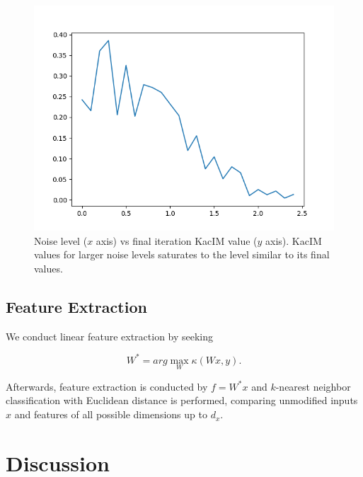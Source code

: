 \documentclass{article}
\begin{document}
\begin{figure}[t]
\label{fig:experiments_noise_level_effect}
\centering
\includegraphics[scale=0.50]{./noise_level_effect_to_kacim.png}
\caption{Noise level ($x$ axis) vs final iteration KacIM value ($y$ axis). KacIM values for larger noise levels saturates to the level similar to its final values.}
\end{figure}



\subsection{Feature Extraction}

We conduct linear feature extraction by seeking 

\begin{equation}
\label{eq:kim_feature_extraction}    
W^{*} = arg \max_{W} \kappa(Wx, y).
\end{equation}



\noindent Afterwards, feature extraction is conducted by $f = W^{*}x$ and $k$-nearest neighbor classification with Euclidean distance is performed, comparing unmodified inputs $x$ and features of all possible dimensions up to $d_{x}$.

\section{Discussion} 
\end{document}
